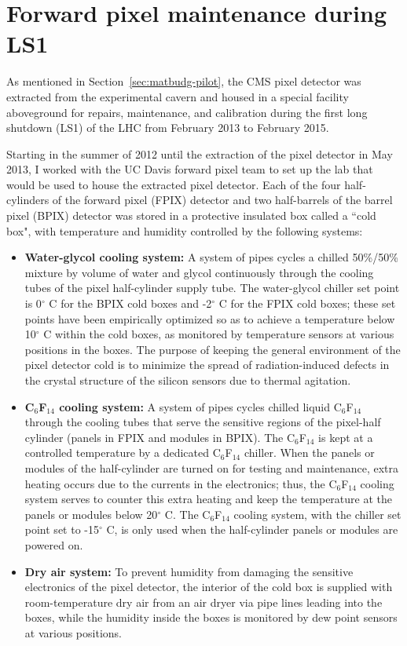 \chapter{Forward pixel maintenance during LS1\label{sec:fpixls1}}

As mentioned in Section~\ref{sec:matbudg-pilot}, the CMS pixel detector was extracted from the experimental cavern and housed in a special facility aboveground for repairs, maintenance, and calibration during the first long shutdown (LS1) of the LHC from February 2013 to February 2015.

Starting in the summer of 2012 until the extraction of the pixel detector in May 2013, I worked with the UC Davis forward pixel team to set up the lab that would be used to house the extracted pixel detector. Each of the four half-cylinders of the forward pixel (FPIX) detector and two half-barrels of the barrel pixel (BPIX) detector was stored in a protective insulated box called a ``cold box", with temperature and humidity controlled by the following systems:

\begin{itemize}
\item \textbf{Water-glycol cooling system:} A system of pipes cycles a chilled 50\%/50\% mixture by volume of water and glycol continuously through the cooling tubes of the pixel half-cylinder supply tube. The water-glycol chiller set point is 0$^{\circ}$ C for the BPIX cold boxes and -2$^{\circ}$ C for the FPIX cold boxes; these set points have been empirically optimized so as to achieve a temperature below 10$^{\circ}$ C within the cold boxes, as monitored by temperature sensors at various positions in the boxes. The purpose of keeping the general environment of the pixel detector cold is to minimize the spread of radiation-induced defects in the crystal structure of the silicon sensors due to thermal agitation.
\item \textbf{C$_{6}$F$_{14}$ cooling system:} A system of pipes cycles chilled liquid C$_{6}$F$_{14}$ through the cooling tubes that serve the sensitive regions of the pixel-half cylinder (panels in FPIX and modules in BPIX). The C$_{6}$F$_{14}$ is kept at a controlled temperature by a dedicated C$_{6}$F$_{14}$ chiller. When the panels or modules of the half-cylinder are turned on for testing and maintenance, extra heating occurs due to the currents in the electronics; thus, the C$_{6}$F$_{14}$ cooling system serves to counter this extra heating and keep the temperature at the panels or modules below 20$^{\circ}$ C. The C$_{6}$F$_{14}$ cooling system, with the chiller set point set to -15$^{\circ}$ C, is only used when the half-cylinder panels or modules are powered on.
\item \textbf{Dry air system:} To prevent humidity from damaging the sensitive electronics of the pixel detector, the interior of the cold box is supplied with room-temperature dry air from an air dryer via pipe lines leading into the boxes, while the humidity inside the boxes is monitored by dew point sensors at various positions.
\end{itemize}


